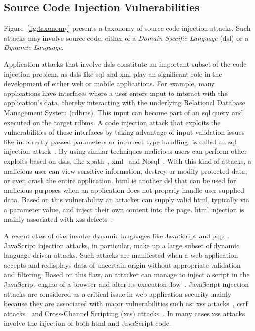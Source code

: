 \documentclass[conference]{IEEEtran}
\begin{document}
\subsection{Source Code Injection Vulnerabilities}

Figure~\ref{fig:taxonomy} presents a taxonomy of source
code injection attacks. Such attacks may involve source code, either of a
{\it Domain Specific Language} ({\sc dsl}) or a {\it Dynamic Language}.

Application attacks that involve {\sc dsl}s constitute an important
subset of the code injection problem, as {\sc dsl}s like {\sc sql} and
{\sc xml} play an significant role in the development of either web or
mobile applications. For example, many applications have interfaces
where a user enters input to interact with the application's data,
thereby interacting with the underlying Relational Database Management
System ({\sc rdbms}). This input can become part of an {\sc sql} query
and executed on the target {\sc rdbms}. A code injection attack that
exploits the vulnerabilities of these interfaces by taking advantage
of input validation issues like incorrectly passed parameters or
incorrect type handling, is called an {\sc sql} injection
attack~\cite{CERT02,MS09,HVO06,SW06}. By using similar techniques
malicious users can perform other exploits based on {\sc dsl}s,
like {\sc xp}ath~\cite{SW06,CDL07,MKS09}, {\sc xml}~\cite{MSM13}
and No{\sc sql}~\cite{SMS13}. With this kind of attacks,
a malicious user can view sensitive information,
destroy or modify protected data, or even crash the entire
application. {\sc html} is another {\sc dsl} that can be used
for malicious purposes when an application does not properly
handle user supplied data. Based on this vulnerability
an attacker can supply valid {\sc html},
typically via a parameter value, and inject their own
content into the page. {\sc html} injection is mainly associated
with {\sc xss} defects~\cite{HNSHS12}.

A recent class of {\sc cia}s involve dynamic languages like
JavaScript and {\sc php}~\cite{SFVM09,EWKK09,SMS13}. JavaScript
injection attacks, in particular, make up a large subset of dynamic
language-driven attacks. Such attacks are manifested when a web
application accepts and redisplays data of uncertain origin without
appropriate validation and filtering. Based on this flaw, an attacker
can manage to inject a script in the JavaScript engine of a browser
and alter its execution flow~\cite{ELX07}. JavaScript injection
attacks are considered as a critical issue in web application security
mainly because they are associated with major vulnerabilities such as:
{\sc xss} attacks~\cite{SG07}, {\sc csrf} attacks~\cite{BJM08,LZRL09} and
Cross-Channel Scripting ({\sc xcs}) attacks~\cite{W10,BBB09}.
In many cases {\sc xss} attacks involve the injection of
both {\sc html} and JavaScript code.
\end{document}
